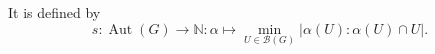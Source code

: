 \documentclass[preview]{standalone}
\begin{document}
It is defined by \[ s : \operatorname{Aut}(G) \to \mathbb{N} : \alpha \mapsto \min_{U \in \mathcal{B}(G)} |\alpha(U) : \alpha(U) \cap U |. \]\\
\end{document}
